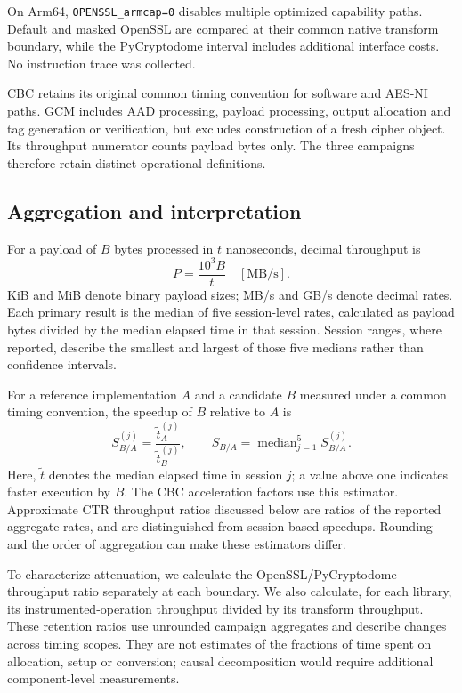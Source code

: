 On Arm64, \texttt{OPENSSL\_armcap=0} disables multiple optimized capability paths. Default and masked OpenSSL are compared at their common native transform boundary, while the PyCryptodome interval includes additional interface costs. No instruction trace was collected.

CBC retains its original common timing convention for software and AES-NI paths. GCM includes AAD processing, payload processing, output allocation and tag generation or verification, but excludes construction of a fresh cipher object. Its throughput numerator counts payload bytes only. The three campaigns therefore retain distinct operational definitions.

\subsection{Aggregation and interpretation}
For a payload of $B$ bytes processed in $t$ nanoseconds, decimal throughput is
\begin{equation}
 P=\frac{10^3 B}{t}\quad [\mathrm{MB/s}].\label{eq:rate}
\end{equation}
KiB and MiB denote binary payload sizes; MB/s and GB/s denote decimal rates. Each primary result is the median of five session-level rates, calculated as payload bytes divided by the median elapsed time in that session. Session ranges, where reported, describe the smallest and largest of those five medians rather than confidence intervals.

For a reference implementation $A$ and a candidate $B$ measured under a common timing convention, the speedup of $B$ relative to $A$ is
\begin{equation}
 S_{B/A}^{(j)}=\frac{\widetilde t_A^{(j)}}{\widetilde t_B^{(j)}},\qquad
 S_{B/A}=\operatorname{median}_{j=1}^{5}S_{B/A}^{(j)}.\label{eq:ratio}
\end{equation}
Here, $\widetilde t$ denotes the median elapsed time in session $j$; a value above one indicates faster execution by $B$. The CBC acceleration factors use this estimator. Approximate CTR throughput ratios discussed below are ratios of the reported aggregate rates, and are distinguished from session-based speedups. Rounding and the order of aggregation can make these estimators differ.

To characterize attenuation, we calculate the OpenSSL/PyCryptodome throughput ratio separately at each boundary. We also calculate, for each library, its instrumented-operation throughput divided by its transform throughput. These retention ratios use unrounded campaign aggregates and describe changes across timing scopes. They are not estimates of the fractions of time spent on allocation, setup or conversion; causal decomposition would require additional component-level measurements.

